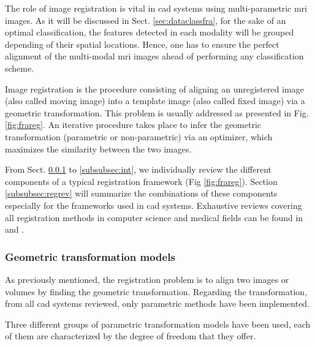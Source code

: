The role of image registration is vital in \ac{cad} systems using multi-parametric \ac{mri} images. As it will be discussed in Sect. \ref{sec:dataclassfra}, for the sake of an optimal classification, the features detected in each modality will be grouped depending of their spatial locations. Hence, one has to ensure the perfect alignment of the multi-modal \ac{mri} images ahead of performing any classification scheme.

Image registration is the procedure consisting of aligning an unregistered image (also called moving image) into a template image (also called fixed image) via a geometric transformation. This problem is usually addressed as presented in Fig. \ref{fig:frareg}. An iterative procedure takes place to infer the geometric transformation (parametric or non-parametric) via an optimizer, which maximizes the similarity between the two images.

From Sect. \ref{subsubsec:geotra} to \ref{subsubsec:int}, we individually review the different components of a typical registration framework (Fig \ref{fig:frareg}). Section \ref{subsubsec:regrev} will summarize the combinations of these components especially for the frameworks used in \ac{cad} systems. Exhaustive reviews covering all registration methods in computer science and medical fields can be found in \cite{Maintz1998} and \cite{Zitova2003}.

\subsubsection{Geometric transformation models}\label{subsubsec:geotra}

As previously mentioned, the registration problem is to align two images or volumes by finding the geometric transformation. Regarding the transformation, from all \ac{cad} systems reviewed, only parametric methods have been implemented.

Three different groups of parametric transformation models have been used, each of them are characterized by the degree of freedom that they offer.

